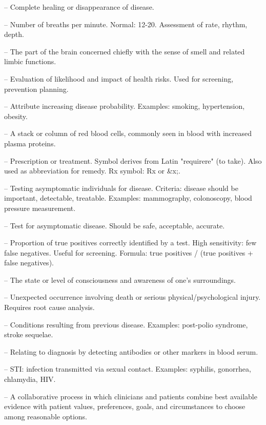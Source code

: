 -- Complete healing or disappearance of disease.

-- Number of breaths per minute. Normal: 12-20. Assessment of rate, rhythm, depth.

-- The part of the brain concerned chiefly with the sense of smell and related limbic functions.

-- Evaluation of likelihood and impact of health risks. Used for screening, prevention planning.

-- Attribute increasing disease probability. Examples: smoking, hypertension, obesity.

-- A stack or column of red blood cells, commonly seen in blood with increased plasma proteins.

-- Prescription or treatment. Symbol derives from Latin "requirere" (to take). Also used as abbreviation for remedy. Rx symbol: Rx or \&x;.

-- Testing asymptomatic individuals for disease. Criteria: disease should be important, detectable, treatable. Examples: mammography, colonoscopy, blood pressure measurement.

-- Test for asymptomatic disease. Should be safe, acceptable, accurate.

-- Proportion of true positives correctly identified by a test. High sensitivity: few false negatives. Useful for screening. Formula: true positives / (true positives + false negatives).

-- The state or level of consciousness and awareness of one's surroundings.

-- Unexpected occurrence involving death or serious physical/psychological injury. Requires root cause analysis.

-- Conditions resulting from previous disease. Examples: post-polio syndrome, stroke sequelae.

-- Relating to diagnosis by detecting antibodies or other markers in blood serum.

-- STI: infection transmitted via sexual contact. Examples: syphilis, gonorrhea, chlamydia, HIV.

-- A collaborative process in which clinicians and patients combine best available evidence with patient values, preferences, goals, and circumstances to choose among reasonable options.

